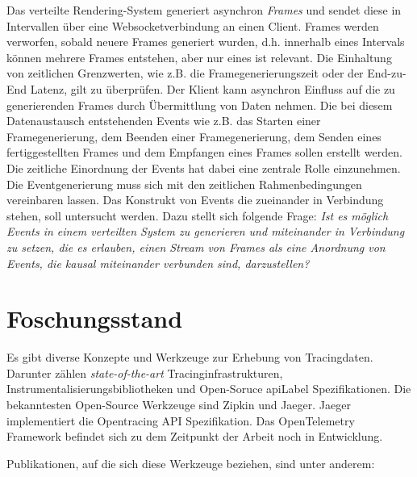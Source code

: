 	Das verteilte Rendering-System generiert asynchron \emph{Frames} und sendet diese in Intervallen über eine Websocketverbindung an einen Client. Frames werden verworfen, sobald neuere Frames generiert wurden, d.h. innerhalb eines Intervals können mehrere Frames entstehen, aber nur eines ist relevant. Die Einhaltung von zeitlichen Grenzwerten, wie z.B. die Framegenerierungszeit oder der End-zu-End Latenz, gilt zu überprüfen. Der Klient kann asynchron Einfluss auf die zu generierenden Frames durch Übermittlung von Daten nehmen. Die bei diesem Datenaustausch entstehenden Events wie z.B. das Starten einer Framegenerierung, dem Beenden einer Framegenerierung, dem Senden eines fertiggestellten Frames und dem Empfangen eines Frames sollen erstellt werden. Die zeitliche Einordnung der Events hat dabei eine zentrale Rolle einzunehmen. Die Eventgenerierung muss sich mit den zeitlichen Rahmenbedingungen vereinbaren lassen. Das Konstrukt von Events die zueinander in Verbindung stehen, soll untersucht werden. Dazu stellt sich folgende Frage: \emph{Ist es möglich Events in einem verteilten System zu generieren und miteinander in Verbindung zu setzen, die es erlauben, einen Stream von Frames als eine Anordnung von Events, die kausal miteinander verbunden sind, darzustellen?}
	
\section{Foschungsstand}
\label{section:Forschungsstand}

Es gibt diverse Konzepte und Werkzeuge zur Erhebung von Tracingdaten. Darunter zählen \emph{state-of-the-art} Tracinginfrastrukturen, Instrumentalisierungsbibliotheken und Open-Soruce \gls{apiLabel} Spezifikationen. Die bekanntesten Open-Source Werkzeuge sind Zipkin und Jaeger. Jaeger implementiert die Opentracing API Spezifikation. Das OpenTelemetry Framework befindet sich zu dem Zeitpunkt der Arbeit noch in Entwicklung.

\newpage
Publikationen, auf die sich diese Werkzeuge beziehen, sind unter anderem: 

